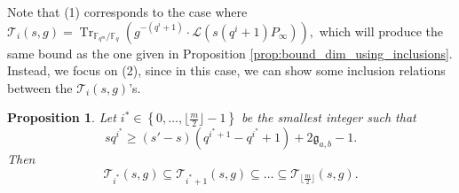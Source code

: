 \documentclass[a4paper]{amsart}
\newtheorem{proposition}[thm]{Proposition}
\theoremstyle{definition}
\theoremstyle{remark}
\newcommand{\calL}{\mathcal{L}}
\newcommand{\calT}{\mathcal{T}}
\newcommand{\fq}{\mathbb{F}_{q}}
\newcommand{\Tr}[1]{\operatorname{Tr}_{\mathbb{F}_{q^m}/\fq}\left(#1\right)}
\newcommand{\set}[1]{\left\{#1\right\}}
\begin{document}
Note that (1) corresponds to the case where $\calT_i(s,g) = \Tr{g^{-(q^i+1)}\cdot \calL(s(q^i+1)P_\infty)}, $ which will produce the same bound as the one given in Proposition \ref{prop:bound_dim_using_inclusions}.
Instead, we focus on (2), since in this case, we can show some inclusion relations between the $\calT_i(s,g)$'s.


\begin{proposition} \label{prop:inclusion_T_i's} Let $i^* \in \set{0,\dots,\lfloor\frac{m}{2}\rfloor-1}$ be the smallest integer such that 
\begin{equation} \label{eq:cond_s_s'_i_star}
sq^{i^*} \geq (s'-s)(q^{i^*+1}-q^{i^{*}}+1)+2\mathfrak{g}_{a,b}-1.
\end{equation} 
Then
$$\calT_{i^*}(s,g) \subseteq \calT_{i^*+1}(s,g) \subseteq \dots \subseteq \calT_{\lfloor \frac{m}{2}\rfloor}(s,g).$$
\end{proposition}
\end{document}
